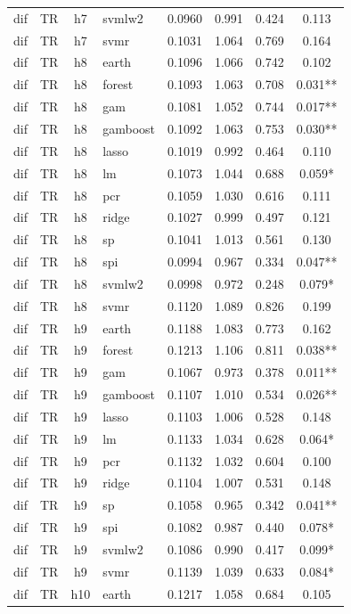 \begin{ThreePartTable}
\begin{longtable}[t]{llclcccc}
dif & TR & h7 & svmlw2 & 0.0960 & 0.991 & 0.424 & 0.113\\
dif & TR & h7 & svmr & 0.1031 & 1.064 & 0.769 & 0.164\\
\addlinespace
dif & TR & h8 & earth & 0.1096 & 1.066 & 0.742 & 0.102\\
dif & TR & h8 & forest & 0.1093 & 1.063 & 0.708 & 0.031**\\
dif & TR & h8 & gam & 0.1081 & 1.052 & 0.744 & 0.017**\\
dif & TR & h8 & gamboost & 0.1092 & 1.063 & 0.753 & 0.030**\\
dif & TR & h8 & lasso & 0.1019 & 0.992 & 0.464 & 0.110\\
dif & TR & h8 & lm & 0.1073 & 1.044 & 0.688 & 0.059*\\
dif & TR & h8 & pcr & 0.1059 & 1.030 & 0.616 & 0.111\\
dif & TR & h8 & ridge & 0.1027 & 0.999 & 0.497 & 0.121\\
dif & TR & h8 & sp & 0.1041 & 1.013 & 0.561 & 0.130\\
dif & TR & h8 & spi & 0.0994 & 0.967 & 0.334 & 0.047**\\
dif & TR & h8 & svmlw2 & 0.0998 & 0.972 & 0.248 & 0.079*\\
dif & TR & h8 & svmr & 0.1120 & 1.089 & 0.826 & 0.199\\
\addlinespace
dif & TR & h9 & earth & 0.1188 & 1.083 & 0.773 & 0.162\\
dif & TR & h9 & forest & 0.1213 & 1.106 & 0.811 & 0.038**\\
dif & TR & h9 & gam & 0.1067 & 0.973 & 0.378 & 0.011**\\
dif & TR & h9 & gamboost & 0.1107 & 1.010 & 0.534 & 0.026**\\
dif & TR & h9 & lasso & 0.1103 & 1.006 & 0.528 & 0.148\\
dif & TR & h9 & lm & 0.1133 & 1.034 & 0.628 & 0.064*\\
dif & TR & h9 & pcr & 0.1132 & 1.032 & 0.604 & 0.100\\
dif & TR & h9 & ridge & 0.1104 & 1.007 & 0.531 & 0.148\\
dif & TR & h9 & sp & 0.1058 & 0.965 & 0.342 & 0.041**\\
dif & TR & h9 & spi & 0.1082 & 0.987 & 0.440 & 0.078*\\
dif & TR & h9 & svmlw2 & 0.1086 & 0.990 & 0.417 & 0.099*\\
dif & TR & h9 & svmr & 0.1139 & 1.039 & 0.633 & 0.084*\\
\addlinespace
dif & TR & h10 & earth & 0.1217 & 1.058 & 0.684 & 0.105\\

\end{longtable}
\end{ThreePartTable}
